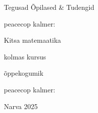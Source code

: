\begin{titlepage}
\par{Tegusad Õpilased \& Tudengid}
\vspace{0.3\textheight}
\par{peacecop kalmer:}
\LARGE
\par{Kitsa matemaatika}
\par{kolmas kursus}
\normalsize
\par{õppekogumik}
\vspace{0.3\textheight}
\begin{flushright}
\par{peacecop kalmer:}
\end{flushright}
\vfill
Narva
\hfill
2025
\end{titlepage}
